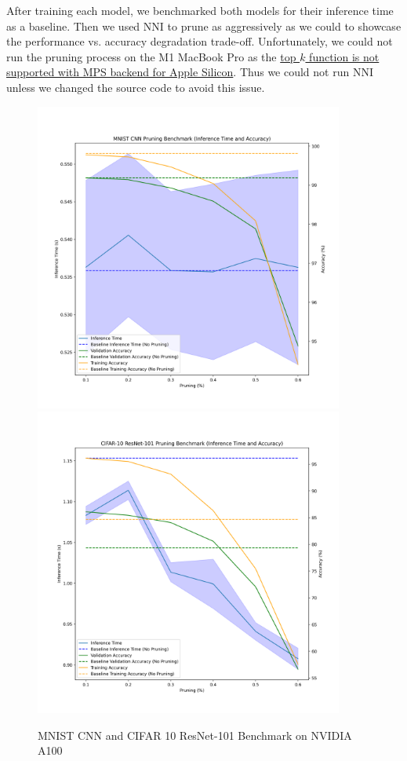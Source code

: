 \documentclass{article}
\begin{document}
After training each model, we benchmarked both models for their inference time as a baseline. Then we used NNI to prune as aggressively as we could to showcase the performance vs. accuracy degradation trade-off. Unfortunately, we could not run the pruning process on the M1 MacBook Pro as the \href{https://github.com/pytorch/pytorch/issues/78915}{top $k$ function is not supported with MPS backend for Apple Silicon}. Thus we could not run NNI unless we changed the source code to avoid this issue.

\begin{figure}
    \centerline{
        \includegraphics[width=4in]{../proj1/figures/mnist_cnn_benchmark.png}
        \includegraphics[width=4in]{../proj1/figures/resnet101_benchmark.png}
    }
    \caption{MNIST CNN and CIFAR 10 ResNet-101 Benchmark on NVIDIA A100}
    \label{fig:a100benchmark}
\end{figure}
\end{document}
